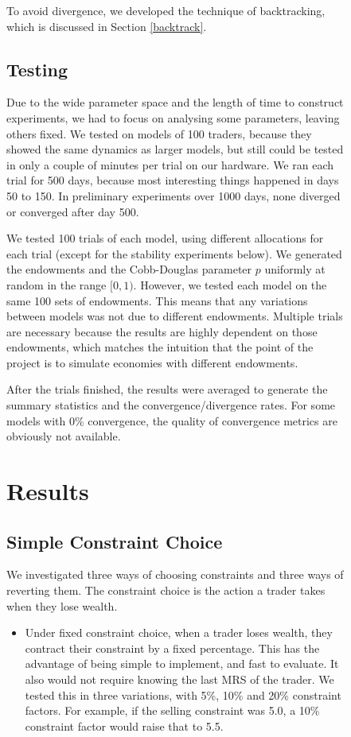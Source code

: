 \documentclass[12pt,a4paper,titlepage]{article}
\newcommand{\co}[1]{\textsf{#1}}
\begin{document}
\begin{figure}[H]
To avoid divergence, we developed the technique of backtracking, which is discussed in Section \ref{backtrack}.

\subsection{Testing}
Due to the wide parameter space and the length of time to construct experiments, we had to focus on analysing some parameters, leaving others fixed.
We tested on models of 100 traders, because they showed the same dynamics as larger models, but still could be tested in only a couple of minutes per trial on our hardware.
We ran each trial for 500 days, because most interesting things happened in days 50 to 150.
In preliminary experiments over 1000 days, none diverged or converged after day 500.

We tested 100 trials of each model, using different allocations for each trial (except for the stability experiments below).
We generated the endowments and the Cobb-Douglas parameter $p$ uniformly at random in the range $[0, 1)$.
However, we tested each model on the same 100 sets of endowments.
This means that any variations between models was not due to different endowments.
Multiple trials are necessary because the results are highly dependent on those endowments, which matches the intuition that the point of the project is to simulate economies with different endowments.
    
After the trials finished, the results were averaged to generate the summary statistics and the convergence/divergence rates.
For some models with 0\% convergence, the quality of convergence metrics are obviously not available.

\clearpage

\section{Results}\label{results}
\subsection{Simple Constraint Choice}
We investigated three ways of choosing constraints and three ways of reverting them.
The constraint choice is the action a trader takes when they lose wealth.

\begin{itemize}
  \item Under \co{fixed} constraint choice, when a trader loses wealth, they contract their constraint by a fixed percentage.
    This has the advantage of being simple to implement, and fast to evaluate.
    It also would not require knowing the last MRS of the trader.
    We tested this in three variations, with 5\%, 10\% and 20\% constraint factors.
    For example, if the selling constraint was 5.0, a 10\% constraint factor would raise that to 5.5.
    

\end{itemize}
\end{figure}
\end{document}

